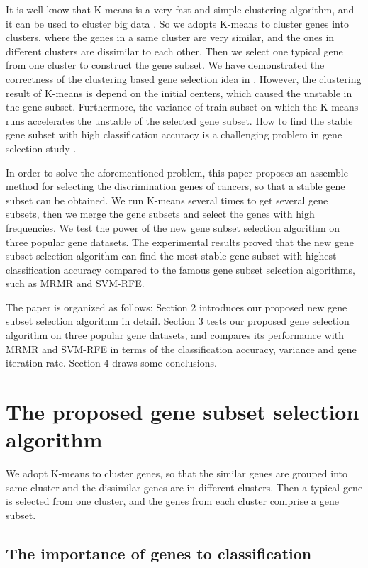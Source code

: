 \documentclass[runningheads,a4paper]{llncs}
\begin{document}
It is well know that K-means \cite{macqueen1967some} is a very fast and simple clustering algorithm, and it can be used to cluster big data \cite{huang1998extensions}. So we adopts K-means to cluster genes into clusters, where the genes in a same cluster are very similar, and the ones in different clusters are dissimilar to each other. Then we select one typical gene from one cluster to construct the gene subset. We have demonstrated the correctness of the clustering based gene selection idea in \cite{xjy2014}. However, the clustering result of K-means is depend on the initial centers, which caused the unstable in the gene subset. Furthermore, the variance of train subset on which the K-means runs accelerates the unstable of the selected gene subset. How to find the stable gene subset with high classification accuracy is a challenging problem in gene selection study \cite{han2012variance,yu2012stable,yu2008stable}.

In order to solve the aforementioned problem, this paper proposes an assemble method for selecting the discrimination genes of cancers, so that a stable gene subset can be obtained. We run K-means several times to get several gene subsets, then we  merge the gene subsets and select the genes with high frequencies. We test the power of the new gene subset selection algorithm on three popular gene datasets. The experimental results proved that the new gene subset selection algorithm can find the most stable gene subset with highest classification accuracy compared to the famous gene subset selection algorithms, such as MRMR and SVM-RFE.

The paper is organized as follows: Section 2 introduces our proposed new gene subset selection algorithm in detail. Section 3 tests our proposed gene selection algorithm on three popular gene datasets, and compares its performance with MRMR and SVM-RFE in terms of the classification accuracy, variance and gene iteration rate. Section 4 draws some conclusions.

\section{The proposed gene subset selection algorithm}
We adopt K-means to cluster genes, so that the similar genes are grouped into same cluster and the dissimilar genes are in different clusters.  Then a typical gene is selected from one cluster, and the genes from each cluster comprise a gene subset.

\subsection{The importance of genes to classification}
\end{document}
